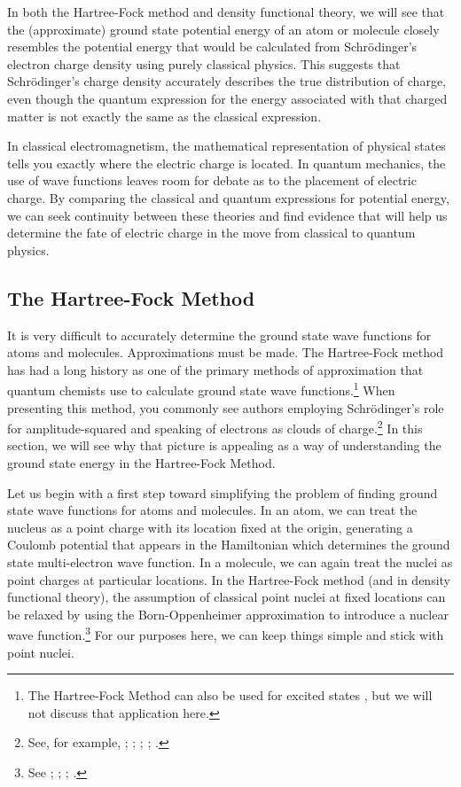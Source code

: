 \documentclass[onecolumn,secnumarabic,amsmath,amssymb,balancelastpage,nofootinbib]{article}
\begin{document}
In both the Hartree-Fock method and density functional theory, we will see that the (approximate) ground state potential energy of an atom or molecule closely resembles the potential energy that would be calculated from Schr\"{o}dinger's electron charge density using purely classical physics.  This suggests that Schr\"{o}dinger's charge density accurately describes the true distribution of charge, even though the quantum expression for the energy associated with that charged matter is not exactly the same as the classical expression.

In classical electromagnetism, the mathematical representation of physical states tells you exactly where the electric charge is located.  In quantum mechanics, the use of wave functions leaves room for debate as to the placement of electric charge.  By comparing the classical and quantum expressions for potential energy, we can seek continuity between these theories and find evidence that will help us determine the fate of electric charge in the move from classical to quantum physics.

\subsection{The Hartree-Fock Method}\label{HFsection}

It is very difficult to accurately determine the ground state wave functions for atoms and molecules.  Approximations must be made.  The Hartree-Fock method has had a long history as one of the primary methods of approximation that quantum chemists use to calculate ground state wave functions.\footnote{The Hartree-Fock Method can also be used for excited states \cite[sec.\ 2.2.6]{szaboQC}, but we will not discuss that application here.}  When presenting this method, you commonly see authors employing Schr\"{o}dinger's role for amplitude-squared and speaking of electrons as clouds of charge.\footnote{See, for example, \cite[ch.\ 9]{slatervol1}; \cite[sec.\ 17.2]{slatervol2}; \cite[pg.\ 432]{blinder1965}; \cite[sec.\ 2.3.6]{szaboQC}; \cite[sec.\ 11.1]{levineQC}.}  In this section, we will see why that picture is appealing as a way of understanding the ground state energy in the Hartree-Fock Method.

Let us begin with a first step toward simplifying the problem of finding ground state wave functions for atoms and molecules.  In an atom, we can treat the nucleus as a point charge with its location fixed at the origin, generating a Coulomb potential that appears in the Hamiltonian which determines the ground state multi-electron wave function.  In a molecule, we can again treat the nuclei as point charges at particular locations.  In the Hartree-Fock method (and in density functional theory), the assumption of classical point nuclei at fixed locations can be relaxed by using the Born-Oppenheimer approximation to introduce a nuclear wave function.\footnote{See \cite[sec.\ 2.1.2]{szaboQC}; \cite[sec.\ 10.1]{mcquarrieQC}; \cite[ch.\ 8]{atkins2011}; \cite[sec.\ 13.1]{levineQC}.}  For our purposes here, we can keep things simple and stick with point nuclei.
\end{document}
